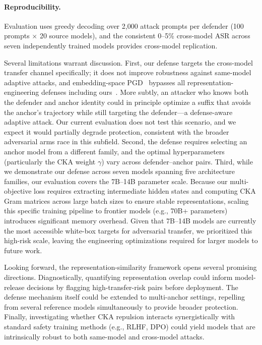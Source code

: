 \paragraph{Reproducibility.}
Evaluation uses greedy decoding over 2,000 attack prompts per defender (100 prompts $\times$ 20 source models), and the consistent 0--5\% cross-model ASR across seven independently trained models provides cross-model replication.

Several limitations warrant discussion. First, our defense targets the cross-model transfer channel specifically; it does not improve robustness against same-model adaptive attacks, and embedding-space PGD~\citep{madry2018towards} bypasses all representation-engineering defenses including ours~\citep{revisiting_cb}. More subtly, an attacker who knows both the defender and anchor identity could in principle optimize a suffix that avoids the anchor's trajectory while still targeting the defender---a defense-aware adaptive attack. Our current evaluation does not test this scenario, and we expect it would partially degrade protection, consistent with the broader adversarial arms race in this subfield. Second, the defense requires selecting an anchor model from a different family, and the optimal hyperparameters (particularly the CKA weight $\gamma$) vary across defender--anchor pairs. Third, while we demonstrate our defense across seven models spanning five architecture families, our evaluation covers the 7B--14B parameter scale. Because our multi-objective loss requires extracting intermediate hidden states and computing CKA Gram matrices across large batch sizes to ensure stable representations, scaling this specific training pipeline to frontier models (e.g., 70B+ parameters) introduces significant memory overhead. Given that 7B--14B models are currently the most accessible white-box targets for adversarial transfer, we prioritized this high-risk scale, leaving the engineering optimizations required for larger models to future work.

Looking forward, the representation-similarity framework opens several promising directions. Diagnostically, quantifying representation overlap could inform model-release decisions by flagging high-transfer-risk pairs before deployment. The defense mechanism itself could be extended to multi-anchor settings, repelling from several reference models simultaneously to provide broader protection. Finally, investigating whether CKA repulsion interacts synergistically with standard safety training methods (e.g., RLHF, DPO) could yield models that are intrinsically robust to both same-model and cross-model attacks.
